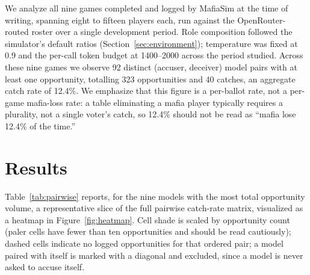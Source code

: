 \documentclass{article}
\begin{document}
We analyze all nine games completed and logged by MafiaSim at the time of writing, spanning eight to fifteen players each, run against the OpenRouter-routed roster over a single development period. Role composition followed the simulator's default ratios (Section~\ref{sec:environment}); temperature was fixed at 0.9 and the per-call token budget at 1400--2000 across the period studied. Across these nine games we observe 92 distinct (accuser, deceiver) model pairs with at least one opportunity, totalling 323 opportunities and 40 catches, an aggregate catch rate of 12.4\%. We emphasize that this figure is a per-ballot rate, not a per-game mafia-loss rate: a table eliminating a mafia player typically requires a plurality, not a single voter's catch, so 12.4\% should not be read as ``mafia lose 12.4\% of the time.''

\section{Results}
\label{sec:results}

Table~\ref{tab:pairwise} reports, for the nine models with the most total opportunity volume, a representative slice of the full pairwise catch-rate matrix, visualized as a heatmap in Figure~\ref{fig:heatmap}. Cell shade is scaled by opportunity count (paler cells have fewer than ten opportunities and should be read cautiously); dashed cells indicate no logged opportunities for that ordered pair; a model paired with itself is marked with a diagonal and excluded, since a model is never asked to accuse itself.
\end{document}
